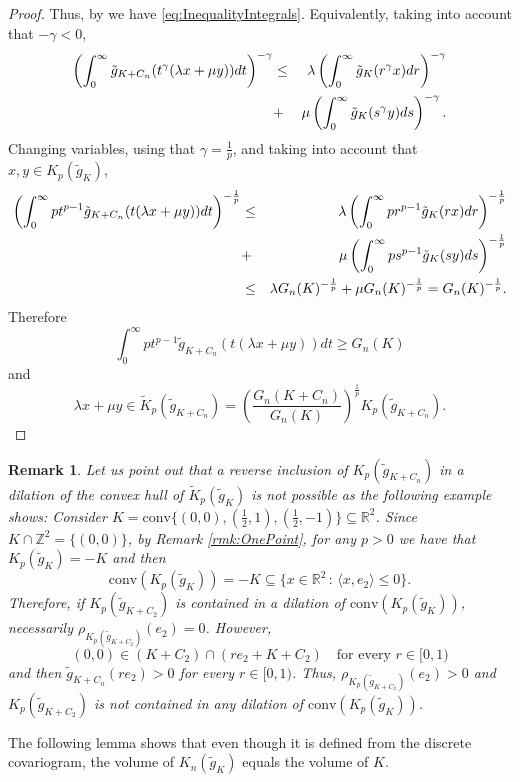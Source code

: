 \documentclass[10pt]{amsart}
\newtheorem{rmk}[thm]{Remark}
\def\R{\mathbb{R}}
\def\Z{\mathbb{Z}}
\numberwithin{equation}{section}
\begin{document}
\begin{proof}
Thus, by \cite[Theorem 2.5.4]{BGVV} we have \eqref{eq:InequalityIntegrals}. Equivalently, taking into account that $-\gamma<0$,
\begin{eqnarray*}
\left(\int_0^\infty \tilde{g}_{K+C_n}(t^\gamma(\lambda x+\mu y))dt\right)^{-\gamma}&\leq& \lambda\left(\int_0^\infty \tilde{g}_K(r^\gamma x)dr\right)^{-\gamma}\cr
&+&\mu\left(\int_0^\infty \tilde{g}_K(s^\gamma y)ds\right)^{-\gamma}.
\end{eqnarray*}
Changing variables, using that $\gamma=\frac{1}{p}$, and taking into account that $x,y\in K_p(\tilde{g}_K)$,
\begin{eqnarray*}
\left(\int_0^\infty pt^{p-1}\tilde{g}_{K+C_n}(t(\lambda x+\mu y))dt\right)^{-\frac{1}{p}}&\leq& \lambda\left(\int_0^\infty pr^{p-1}\tilde{g}_K(r x)dr\right)^{-\frac{1}{p}}\cr
&+&\mu\left(\int_0^\infty ps^{p-1}\tilde{g}_K(s y)ds\right)^{-\frac{1}{p}}\cr
&\leq&\lambda G_n(K)^{-\frac{1}{p}}+\mu G_n(K)^{-\frac{1}{p}}=G_n(K)^{-\frac{1}{p}}.
\end{eqnarray*}
Therefore
$$
\int_0^\infty pt^{p-1}\tilde{g}_{K+C_n}(t(\lambda x+\mu y))dt\geq G_n(K)
$$
and
$$
\lambda x+\mu y\in \tilde{K}_p(\tilde{g}_{K+C_n})=\left(\frac{G_n(K+C_n)}{G_n(K)}\right)^\frac{1}{p}K_p(\tilde{g}_{K+C_n}).
$$
\end{proof}

\begin{rmk}
Let us point out that a reverse inclusion of $K_p(\tilde{g}_{K+C_n})$ in a dilation of the convex hull of $\tilde{K}_p(\tilde{g}_K)$ is not possible as the following example shows: Consider $K=\textrm{conv}\{(0,0),\left(\frac{1}{2},1\right),\left(\frac{1}{2},-1\right)\}\subseteq\R^2$. Since $K\cap\Z^2=\{(0,0)\}$, by Remark \ref{rmk:OnePoint}, for any $p>0$ we have that $K_p(\tilde{g}_K)=-K$
and then
$$
\textrm{conv}(K_p(\tilde{g}_K))=-K\subseteq \{x\in\R^2\,:\,\langle x,e_2\rangle\leq0\}.
$$
Therefore, if $K_p(\tilde{g}_{K+C_2})$ is contained in a dilation of $\textrm{conv}(K_p(\tilde{g}_K))$, necessarily $\rho_{K_p(\tilde{g}_{K+C_2})}(e_2)=0$. However,
$$
(0,0)\in (K+C_2)\cap (re_2+K+C_2)\quad\textrm{for every }r\in[0,1)
$$
and then $\tilde{g}_{K+C_n}(re_2)>0$ for every $r\in[0,1)$. Thus, $\rho_{K_p(\tilde{g}_{K+C_2})}(e_2)>0$ and $K_p(\tilde{g}_{K+C_2})$ is not contained in any dilation of $\textrm{conv}(K_p(\tilde{g}_K))$.
\end{rmk}

The following lemma shows that even though it is defined from the discrete covariogram, the volume of $K_n(\tilde{g}_K)$ equals the volume of $K$.
\end{document}
